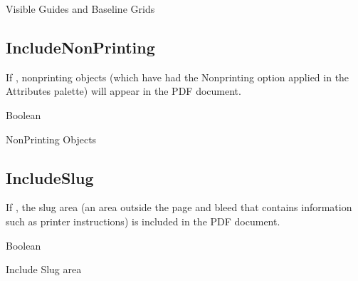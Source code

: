 \documentclass[letterpaper,12pt,english,openany,oneside]{sphinxmanual}
\begin{document}
Visible Guides and Baseline Grids

\label{\detokenize{PDF_Create_NewNamespaces:default-value-30}}

\begin{sphinxVerbatim}[commandchars=\\\{\}]
\end{sphinxVerbatim}


\subsection{IncludeNonPrinting}
\label{\detokenize{PDF_Create_NewNamespaces:includenonprinting}}
If  , non\sphinxhyphen{}printing objects (which have had the Nonprinting option applied in the Attributes palette) will appear in the PDF document.

\label{\detokenize{PDF_Create_NewNamespaces:type-32}}

Boolean

\label{\detokenize{PDF_Create_NewNamespaces:ui-name-32}}

Non\sphinxhyphen{}Printing Objects

\label{\detokenize{PDF_Create_NewNamespaces:default-value-31}}

\begin{sphinxVerbatim}[commandchars=\\\{\}]
\end{sphinxVerbatim}


\subsection{IncludeSlug}
\label{\detokenize{PDF_Create_NewNamespaces:includeslug}}
If  , the slug area (an area outside the page and bleed that contains information such as printer instructions) is included in the PDF document.

\label{\detokenize{PDF_Create_NewNamespaces:type-33}}

Boolean

\label{\detokenize{PDF_Create_NewNamespaces:ui-name-33}}

Include Slug area

\label{\detokenize{PDF_Create_NewNamespaces:default-value-32}}
\end{document}

